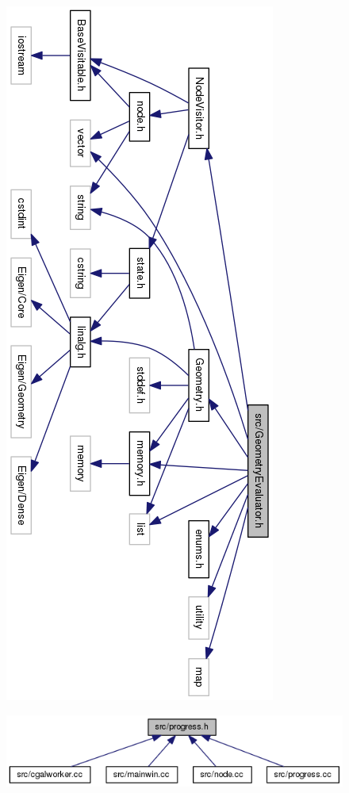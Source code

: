 \begin{figure}
\centering
\includegraphics[height=1.37\columnwidth]{images/GeometryEvaluator_8h__incl}
\caption{}
\label{fig:geometryevaluator8hincl}
\end{figure}

\begin{figure}
\centering
\includegraphics[width=\linewidth]{images/progress_8h__dep__incl}
\caption{}
\label{fig:progress8hdepincl}
\end{figure}
